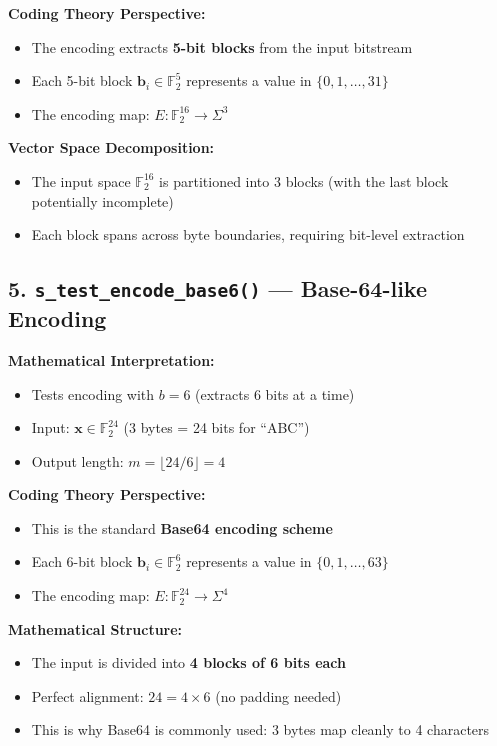 \documentclass[11pt,a4paper]{article}
\begin{document}
\textbf{Coding Theory Perspective:}
\begin{itemize}
\item The encoding extracts \textbf{5-bit blocks} from the input bitstream
\item Each 5-bit block $\mathbf{b}_i \in \mathbb{F}_2^5$ represents a value in $\{0, 1, \ldots, 31\}$
\item The encoding map: $E: \mathbb{F}_2^{16} \rightarrow \Sigma^3$
\end{itemize}

\textbf{Vector Space Decomposition:}
\begin{itemize}
\item The input space $\mathbb{F}_2^{16}$ is partitioned into 3 blocks (with the last block potentially incomplete)
\item Each block spans across byte boundaries, requiring bit-level extraction
\end{itemize}

\subsection{5. \texttt{s\_test\_encode\_base6()} --- Base-64-like Encoding}

\textbf{Mathematical Interpretation:}
\begin{itemize}
\item Tests encoding with $b = 6$ (extracts 6 bits at a time)
\item Input: $\mathbf{x} \in \mathbb{F}_2^{24}$ (3 bytes = 24 bits for ``ABC'')
\item Output length: $m = \lfloor 24/6 \rfloor = 4$
\end{itemize}

\textbf{Coding Theory Perspective:}
\begin{itemize}
\item This is the standard \textbf{Base64 encoding scheme}
\item Each 6-bit block $\mathbf{b}_i \in \mathbb{F}_2^6$ represents a value in $\{0, 1, \ldots, 63\}$
\item The encoding map: $E: \mathbb{F}_2^{24} \rightarrow \Sigma^4$
\end{itemize}

\textbf{Mathematical Structure:}
\begin{itemize}
\item The input is divided into \textbf{4 blocks of 6 bits each}
\item Perfect alignment: $24 = 4 \times 6$ (no padding needed)
\item This is why Base64 is commonly used: 3 bytes map cleanly to 4 characters
\end{itemize}
\end{document}
